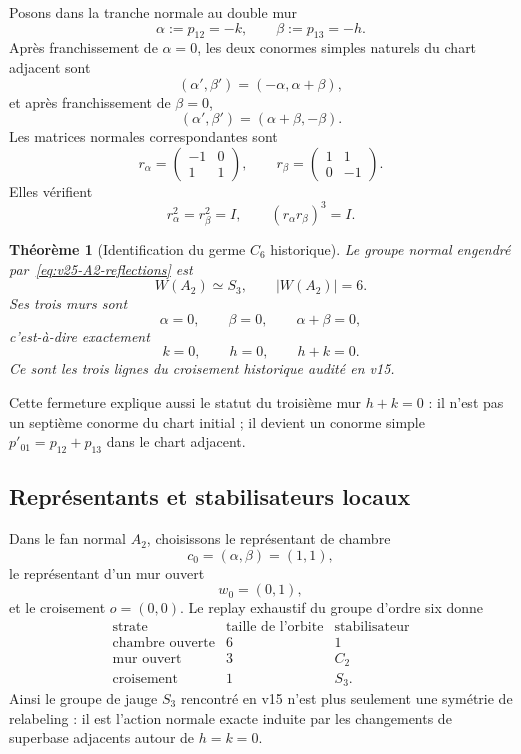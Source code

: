 \documentclass[11pt,a4paper]{article}
\newtheorem{theorem}{Théorème}[section]
\begin{document}
Posons dans la tranche normale au double mur
\begin{equation}\label{eq:v25-alpha-beta}
 \boxed{
 \alpha:=p_{12}=-k,
 \qquad
 \beta:=p_{13}=-h.}
\end{equation}
Après franchissement de $\alpha=0$, les deux conormes simples naturels du chart adjacent sont
\[
 (\alpha',\beta')=(-\alpha,\alpha+\beta),
\]
et après franchissement de $\beta=0$,
\[
 (\alpha',\beta')=(\alpha+\beta,-\beta).
\]
Les matrices normales correspondantes sont
\begin{equation}\label{eq:v25-A2-reflections}
 \boxed{
 r_\alpha=
 \begin{pmatrix}-1&0\\1&1\end{pmatrix},
 \qquad
 r_\beta=
 \begin{pmatrix}1&1\\0&-1\end{pmatrix}.}
\end{equation}
Elles vérifient
\[
 r_\alpha^2=r_\beta^2=I,
 \qquad
 (r_\alpha r_\beta)^3=I.
\]

\begin{theorem}[Identification du germe $C_6$ historique]
Le groupe normal engendré par~\eqref{eq:v25-A2-reflections} est
\[
 \boxed{W(A_2)\simeq S_3,\qquad |W(A_2)|=6.}
\]
Ses trois murs sont
\[
 \alpha=0,
 \qquad
 \beta=0,
 \qquad
 \alpha+\beta=0,
\]
c'est-à-dire exactement
\begin{equation}\label{eq:v25-historical-walls}
 \boxed{
 k=0,
 \qquad
 h=0,
 \qquad
 h+k=0.}
\end{equation}
Ce sont les trois lignes du croisement historique audité en v15.
\end{theorem}

Cette fermeture explique aussi le statut du troisième mur $h+k=0$ : il n'est pas un septième conorme du chart initial ; il devient un conorme simple $p'_{01}=p_{12}+p_{13}$ dans le chart adjacent.

\subsection{Représentants et stabilisateurs locaux}

Dans le fan normal $A_2$, choisissons le représentant de chambre
\[
 c_0=(\alpha,\beta)=(1,1),
\]
le représentant d'un mur ouvert
\[
 w_0=(0,1),
\]
et le croisement $o=(0,0)$. Le replay exhaustif du groupe d'ordre six donne
\begin{equation}\label{eq:v25-local-stabilizers}
 \boxed{
 \begin{array}{c|c|c}
 \text{strate}&\text{taille de l'orbite}&\text{stabilisateur}\\
 \hline
 \text{chambre ouverte}&6&1\\
 \text{mur ouvert}&3&C_2\\
 \text{croisement}&1&S_3.
 \end{array}}
\end{equation}
Ainsi le groupe de jauge $S_3$ rencontré en v15 n'est plus seulement une symétrie de relabeling : il est l'action normale exacte induite par les changements de superbase adjacents autour de $h=k=0$.
\end{document}
